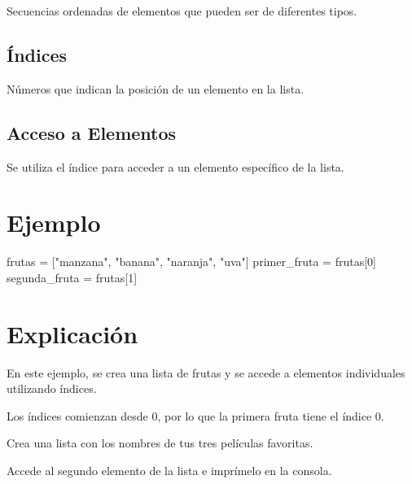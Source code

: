 \documentclass[
  a4paper,
  DIV=11,
  numbers=noendperiod,
  onepage,
  openany]{scrreprt}
\newenvironment{Shaded}{\begin{snugshade}}{\end{snugshade}}
\newcommand{\DecValTok}[1]{\textcolor[rgb]{0.68,0.00,0.00}{#1}}
\newcommand{\NormalTok}[1]{\textcolor[rgb]{0.00,0.23,0.31}{#1}}
\newcommand{\OperatorTok}[1]{\textcolor[rgb]{0.37,0.37,0.37}{#1}}
\newcommand{\StringTok}[1]{\textcolor[rgb]{0.13,0.47,0.30}{#1}}
\begin{document}
Secuencias ordenadas de elementos que pueden ser de diferentes tipos.

\hypertarget{uxedndices-1}{%
\subsection{Índices}\label{uxedndices-1}}

Números que indican la posición de un elemento en la lista.

\hypertarget{acceso-a-elementos-1}{%
\subsection{Acceso a Elementos}\label{acceso-a-elementos-1}}

Se utiliza el índice para acceder a un elemento específico de la lista.

\hypertarget{ejemplo-19}{%
\section{Ejemplo}\label{ejemplo-19}}

\begin{Shaded}
\begin{Highlighting}[]
\NormalTok{frutas }\OperatorTok{=}\NormalTok{ [}\StringTok{"manzana"}\NormalTok{, }\StringTok{"banana"}\NormalTok{, }\StringTok{"naranja"}\NormalTok{, }\StringTok{"uva"}\NormalTok{]}
\NormalTok{primer\_fruta }\OperatorTok{=}\NormalTok{ frutas[}\DecValTok{0}\NormalTok{]}
\NormalTok{segunda\_fruta }\OperatorTok{=}\NormalTok{ frutas[}\DecValTok{1}\NormalTok{]}
\end{Highlighting}
\end{Shaded}

\hypertarget{explicaciuxf3n-19}{%
\section{Explicación}\label{explicaciuxf3n-19}}

En este ejemplo, se crea una lista de frutas y se accede a elementos
individuales utilizando índices.

Los índices comienzan desde 0, por lo que la primera fruta tiene el
índice 0.

\begin{tcolorbox}[enhanced jigsaw, colbacktitle=quarto-callout-important-color!10!white, toprule=.15mm, leftrule=.75mm, titlerule=0mm, opacityback=0, rightrule=.15mm, opacitybacktitle=0.6, breakable, left=2mm, coltitle=black, title=\textcolor{quarto-callout-important-color}{\faExclamation}\hspace{0.5em}{Actividad Práctica:}, toptitle=1mm, bottomtitle=1mm, arc=.35mm, bottomrule=.15mm, colback=white, colframe=quarto-callout-important-color-frame]

Crea una lista con los nombres de tus tres películas favoritas.

Accede al segundo elemento de la lista e imprímelo en la consola.

\end{tcolorbox}
\end{document}
